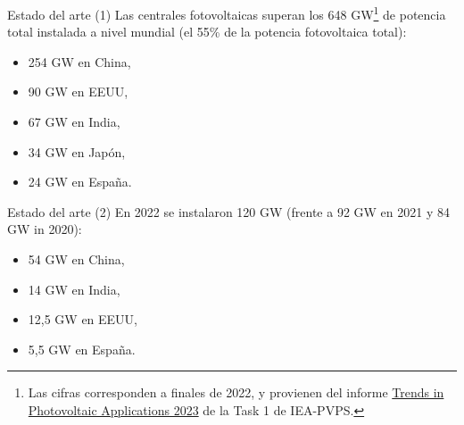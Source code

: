 \documentclass[aspectratio=169, usenames,svgnames,dvipsnames]{beamer}
\begin{document}
\begin{frame}[label={sec:org5b06b2a}]{Estado del arte (1)}
Las centrales fotovoltaicas superan los 648 GW\footnote{Las cifras corresponden a finales de 2022, y provienen del informe \guillemotleft{}\href{https://iea-pvps.org/trends\_reports/trends-2023/}{Trends in Photovoltaic Applications 2023}\guillemotright{} de la Task 1 de IEA-PVPS.}  de potencia total instalada a nivel mundial (el 55\% de la potencia fotovoltaica total):
\begin{itemize}
\item 254 GW en China,
\item 90 GW en EEUU,
\item 67 GW en India,
\item 34 GW en Japón,
\item 24 GW en España.
\end{itemize}
\end{frame}



\begin{frame}[label={sec:org1d89d1d}]{Estado del arte (2)}
En 2022 se instalaron 120 GW  (frente a 92 GW en 2021 y 84 GW in 2020):
\begin{itemize}
\item 54 GW en China,
\item 14 GW en India,
\item 12,5 GW en EEUU,
\item 5,5 GW en España.
\end{itemize}
\end{frame}
\end{document}
